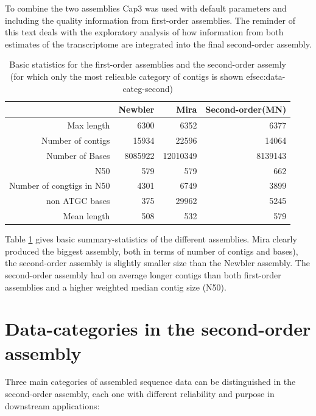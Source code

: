 \documentclass[12pt,a4paper]{article}
\begin{document}
To combine the two assemblies Cap3 was used with default parameters
and including the quality information from first-order assemblies. The
reminder of this text deals with the exploratory analysis of how
information from both estimates of the transcriptome are integrated
into the final second-order assembly.

\begin{table}[ht]
\begin{center}
\begin{tabular}{rrrr}
  \hline
 & Newbler & Mira & Second-order(MN) \\ 
  \hline
Max length & 6300 & 6352 & 6377 \\ 
  Number of contigs & 15934 & 22596 & 14064 \\ 
  Number of Bases & 8085922 & 12010349 & 8139143 \\ 
  N50 & 579 & 579 & 662 \\ 
  Number of congtigs in N50 & 4301 & 6749 & 3899 \\ 
  non ATGC bases & 375 & 29962 & 5245 \\ 
  Mean length & 508 & 532 & 579 \\ 
   \hline
\end{tabular}
\caption{Basic statistics for the first-order assemblies and the second-order assemly (for which only the most relieable category of contigs is shown 
ef{sec:data-categ-second})}
\label{tab:pc}
\end{center}
\end{table}
Table \ref{tab:pc} gives basic summary-statistics of the different
assemblies. Mira clearly produced the biggest assembly, both in terms
of number of contigs and bases), the second-order assembly is slightly
smaller size than the Newbler assembly.  The second-order assembly had
on average longer contigs than both first-order assemblies and a
higher weighted median contig size (N50).



\newpage
\section{Data-categories in the second-order assembly}
\label{sec:data-categ-second}

Three main categories of assembled sequence data can be distinguished
in the second-order assembly, each one with different reliability and
purpose in downstream applications:
\end{document}
